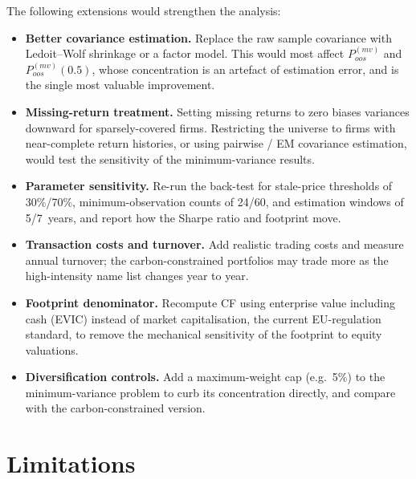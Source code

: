 \documentclass[11pt,a4paper]{article}
\newcommand{\pmv}{$P^{(mv)}_{oos}$}
\newcommand{\pmvh}{$P^{(mv)}_{oos}(0.5)$}
\begin{document}
The following extensions would strengthen the analysis:
\begin{itemize}[nosep,leftmargin=1.3em]
  \item \textbf{Better covariance estimation.} Replace the raw sample
        covariance with Ledoit--Wolf shrinkage or a factor model. This would
        most affect \pmv{} and \pmvh{}, whose concentration is an artefact of
        estimation error, and is the single most valuable improvement.
  \item \textbf{Missing-return treatment.} Setting missing returns to zero
        biases variances downward for sparsely-covered firms. Restricting the
        universe to firms with near-complete return histories, or using
        pairwise / EM covariance estimation, would test the sensitivity of the
        minimum-variance results.
  \item \textbf{Parameter sensitivity.} Re-run the back-test for stale-price
        thresholds of 30\%/70\%, minimum-observation counts of 24/60, and
        estimation windows of 5/7~years, and report how the Sharpe ratio and
        footprint move.
  \item \textbf{Transaction costs and turnover.} Add realistic trading costs
        and measure annual turnover; the carbon-constrained portfolios may
        trade more as the high-intensity name list changes year to year.
  \item \textbf{Footprint denominator.} Recompute CF using enterprise value
        including cash (EVIC) instead of market capitalisation, the current
        EU-regulation standard, to remove the mechanical sensitivity of the
        footprint to equity valuations.
  \item \textbf{Diversification controls.} Add a maximum-weight cap (e.g.\ 5\%)
        to the minimum-variance problem to curb its concentration directly, and
        compare with the carbon-constrained version.
\end{itemize}

\section{Limitations}
\label{sec:limits}
\end{document}
